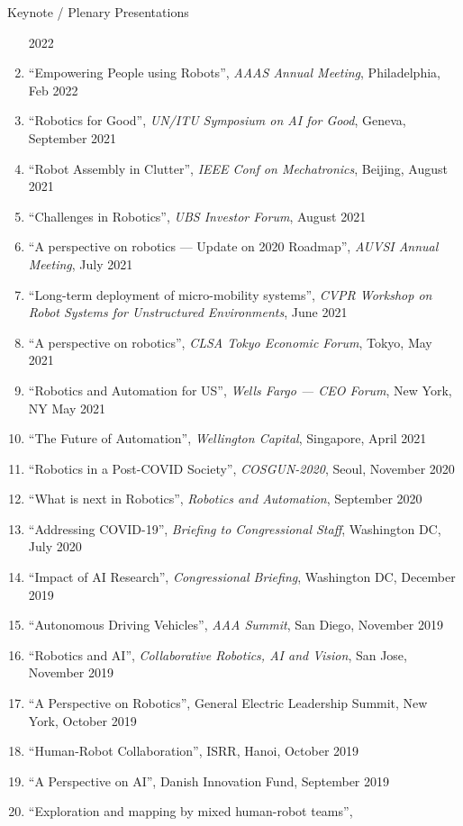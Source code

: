 \documentclass{article}
\begin{document}
\begin{cv}
\begin{cvlist}{Keynote / Plenary Presentations}
\begin{enumerate}
			      2022
			\item ``Empowering People using Robots'', {\em AAAS Annual Meeting},
			      Philadelphia, Feb 2022
			\item ``Robotics for Good'', {\em UN/ITU Symposium on AI for Good}, Geneva,
			      September 2021
			\item ``Robot Assembly in Clutter'', {\em IEEE Conf on Mechatronics}, Beijing,
			      August 2021
			\item ``Challenges in Robotics'', {\em UBS Investor Forum}, August 2021
			\item ``A perspective on robotics --- Update on 2020 Roadmap'', {\em AUVSI
					      Annual Meeting}, July 2021
			\item ``Long-term deployment of micro-mobility systems'', {\em CVPR Workshop on
					      Robot Systems for Unstructured Environments}, June 2021
			\item ``A perspective on robotics'', {\em CLSA Tokyo Economic Forum}, Tokyo, May
			      2021
			\item ``Robotics and Automation for US'', {\em Wells Fargo --- CEO Forum}, New
			      York, NY May 2021
			\item ``The Future of Automation'', {\em Wellington Capital}, Singapore,
			      April 2021
			\item ``Robotics in a Post-COVID Society'', {\em COSGUN-2020}, Seoul, November
			      2020
			\item ``What is next in Robotics'', {\em Robotics and Automation}, September
			      2020
			\item ``Addressing COVID-19'', {\em Briefing to Congressional Staff}, Washington
			      DC, July 2020
			\item ``Impact of AI Research'', {\em Congressional Briefing}, Washington DC,
			      December 2019
			\item ``Autonomous Driving Vehicles'', {\em AAA Summit}, San Diego, November
			      2019
			\item ``Robotics and AI'', {\em Collaborative Robotics, AI and Vision}, San
			      Jose, November 2019
			\item ``A Perspective on Robotics'', General Electric Leadership Summit, New
			      York, October 2019
			\item ``Human-Robot Collaboration'', ISRR, Hanoi, October 2019
			\item ``A Perspective on AI'', Danish Innovation Fund, September 2019
			\item ``Exploration and mapping by mixed human-robot teams'', {\em
}
\end{enumerate}
\end{cvlist}
\end{cv}
\end{document}

